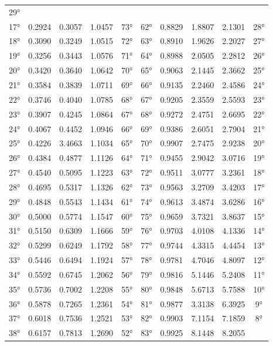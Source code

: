 {\begin{longtable}[]{@{}lccccccccc@{}}
29° \\
17° & 0.2924 & 0.3057 & 1.0457 & 73° & 62° & 0.8829 & 1.8807 & 2.1301 &
28° \\
18° & 0.3090 & 0.3249 & 1.0515 & 72° & 63° & 0.8910 & 1.9626 & 2.2027 &
27° \\
19° & 0.3256 & 0.3443 & 1.0576 & 71° & 64° & 0.8988 & 2.0505 & 2.2812 &
26° \\
20° & 0.3420 & 0.3640 & 1.0642 & 70° & 65° & 0.9063 & 2.1445 & 2.3662 &
25° \\
21° & 0.3584 & 0.3839 & 1.0711 & 69° & 66° & 0.9135 & 2.2460 & 2.4586 &
24° \\
22° & 0.3746 & 0.4040 & 1.0785 & 68° & 67° & 0.9205 & 2.3559 & 2.5593 &
23° \\
23° & 0.3907 & 0.4245 & 1.0864 & 67° & 68° & 0.9272 & 2.4751 & 2.6695 &
22° \\
24° & 0.4067 & 0.4452 & 1.0946 & 66° & 69° & 0.9386 & 2.6051 & 2.7904 &
21° \\
25° & 0.4226 & 3.4663 & 1.1034 & 65° & 70° & 0.9907 & 2.7475 & 2.9238 &
20° \\
26° & 0.4384 & 0.4877 & 1.1126 & 64° & 71° & 0.9455 & 2.9042 & 3.0716 &
19° \\
27° & 0.4540 & 0.5095 & 1.1223 & 63° & 72° & 0.9511 & 3.0777 & 3.2361 &
18° \\
28° & 0.4695 & 0.5317 & 1.1326 & 62° & 73° & 0.9563 & 3.2709 & 3.4203 &
17° \\
29° & 0.4848 & 0.5543 & 1.1434 & 61° & 74° & 0.9613 & 3.4874 & 3.6286 &
16° \\
30° & 0.5000 & 0.5774 & 1.1547 & 60° & 75° & 0.9659 & 3.7321 & 3.8637 &
15° \\
31° & 0.5150 & 0.6309 & 1.1666 & 59° & 76° & 0.9703 & 4.0108 & 4.1336 &
14° \\
32° & 0.5299 & 0.6249 & 1.1792 & 58° & 77° & 0.9744 & 4.3315 & 4.4454 &
13° \\
33° & 0.5446 & 0.6494 & 1.1924 & 57° & 78° & 0.9781 & 4.7046 & 4.8097 &
12° \\
34° & 0.5592 & 0.6745 & 1.2062 & 56° & 79° & 0.9816 & 5.1446 & 5.2408 &
11° \\
35° & 0.5736 & 0.7002 & 1.2208 & 55° & 80° & 0.9848 & 5.6713 & 5.7588 &
10° \\
36° & 0.5878 & 0.7265 & 1.2361 & 54° & 81° & 0.9877 & 3.3138 & 6.3925 &
9° \\
37° & 0.6018 & 0.7536 & 1.2521 & 53° & 82° & 0.9903 & 7.1154 & 7.1859 &
8° \\
38° & 0.6157 & 0.7813 & 1.2690 & 52° & 83° & 0.9925 & 8.1448 & 8.2055 &

\end{longtable}}
